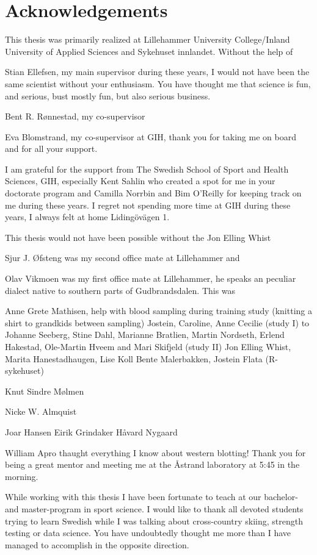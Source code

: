 \documentclass[twoside,10pt]{gihclass} %
\begin{document}
\hypertarget{acknowledgements}{%
\chapter{Acknowledgements}\label{acknowledgements}}

This thesis was primarily realized at Lillehammer University College/Inland University of Applied Sciences and Sykehuset innlandet. Without the help of

Stian Ellefsen, my main supervisor during these years, I would not have been the same scientist without your enthusiasm. You have thought me that science is fun, and serious, bust mostly fun, but also serious business.

Bent R. Rønnestad, my co-supervisor

Eva Blomstrand, my co-supervisor at GIH, thank you for taking me on board and for all your support.

I am grateful for the support from The Swedish School of Sport and Health
Sciences, GIH, especially Kent Sahlin who created a spot for me in your doctorate program and Camilla Norrbin and Bim O'Reilly for keeping track on me during these years. I regret not spending more time at GIH during these years, I always felt at home Lidingövägen 1.

This thesis would not have been possible without the Jon Elling Whist

Sjur J. Øfsteng was my second office mate at Lillehammer and

Olav Vikmoen was my first office mate at Lillehammer, he speaks an peculiar dialect native to southern parts of Gudbrandsdalen. This was

Anne Grete Mathisen, help with blood sampling during training study (knitting a shirt to grandkids between sampling)
Jostein, Caroline, Anne Cecilie (study I)
to Johanne Seeberg, Stine Dahl, Marianne Bratlien, Martin Nordseth, Erlend Hakestad, Ole-Martin Hveem and Mari Skifjeld (study II)
Jon Elling Whist, Marita Hanestadhaugen, Lise Koll
Bente Malerbakken, Jostein Flata (R-sykehuset)

Knut Sindre Mølmen

Nicke W. Almquist

Joar Hansen
Eirik Grindaker
Håvard Nygaard

William Apro thaught everything I know about western blotting! Thank you for being a great mentor and meeting me at the Åstrand laboratory at 5:45 in the morning.

While working with this thesis I have been fortunate to teach at our bachelor- and master-program in sport science. I would like to thank all devoted students trying to learn Swedish while I was talking about cross-country skiing, strength testing or data science. You have undoubtedly thought me more than I have managed to accomplish in the opposite direction.
\end{document}

